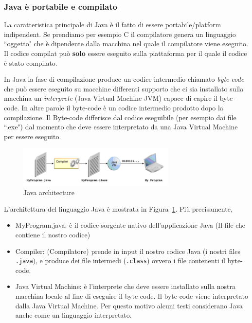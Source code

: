 \documentclass{article}
\theoremstyle{definition}
\begin{document}
\subsubsection{Java \`e portabile e compilato}
La caratteristica principale di Java \`e il fatto di essere portabile/platform indipendent. Se prendiamo per esempio C il compilatore genera un linguaggio ``oggetto" che \`e dipendente dalla macchina nel quale il compilatore viene eseguito. Il codice compilat pu\`o \textbf{solo} essere eseguito sulla piattaforma per il quale il codice \`e stato compilato.

In Java la fase di compilazione produce un codice intermedio chiamato \emph{byte-code} che pu\`o essere eseguito su macchine differenti supporto che ci sia installato sulla macchina un \emph{interprete} (Java Virtual Machine JVM) capace di capire il byte-code. In altre parole il byte-code \`e un codice intermedio prodotto dopo la compilazione. Il Byte-code differisce dal codice eseguibile (per esempio dai file ``.exe") dal momento che deve essere interpretato da una  Java Virtual Machine per essere eseguito.

\begin{figure}[h]
\centering
    \includegraphics[width=0.7\textwidth]{Img/jvm-architecture.png}
    \caption{Java architecture}
    \label{JavaArchitecture}
\end{figure}

L'architettura del linguaggio Java \`e mostrata in Figura~\ref{JavaArchitecture}. Pi\`u precisamente,

\begin{itemize}
\item MyProgram.java: \`e il codice sorgente nativo dell'applicazione Java (Il file che contiene il nostro codice)
\item Compiler: (Compilatore) prende in input il nostro codice Java  (i nostri files \texttt{.java}), e produce dei file intermedi  (\texttt{.class}) ovvero i file contenenti il byte-code.
\item Java Virtual Machine: \`e l'interprete che deve essere installato sulla nostra macchina locale al fine di eseguire il byte-code. Il byte-code viene interpretato dalla Java Virtual Machine. Per questo motivo alcuni testi considerano Java anche come un linguaggio interpretato.
\end{itemize}
\end{document}
